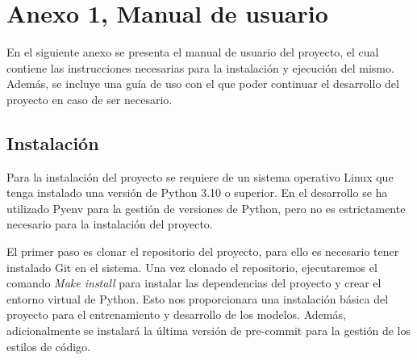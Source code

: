 \section{Anexo 1, Manual de usuario}
En el siguiente anexo se presenta el manual de usuario del proyecto,
el cual contiene las instrucciones necesarias para la instalación y
ejecución del mismo. Además, se incluye una guía de uso con el que
poder continuar el desarrollo del proyecto en caso de ser necesario.

\subsection{Instalación}
Para la instalación del proyecto se requiere de un sistema operativo
Linux que tenga instalado una versión de Python 3.10 o superior. En
el desarrollo se ha utilizado Pyenv para la gestión de versiones de
Python, pero no es estrictamente necesario para la instalación del 
proyecto.\medskip

El primer paso es clonar el repositorio del proyecto, para ello es
necesario tener instalado Git en el sistema. Una vez clonado el
repositorio, ejecutaremos el comando \textit{Make install} para 
instalar las dependencias del proyecto y crear el entorno virtual
de Python. Esto nos proporcionara una instalación básica del proyecto
para el entrenamiento y desarrollo de los modelos. Además, adicionalmente
se instalará la última versión de pre-commit para la gestión de los
estilos de código.

